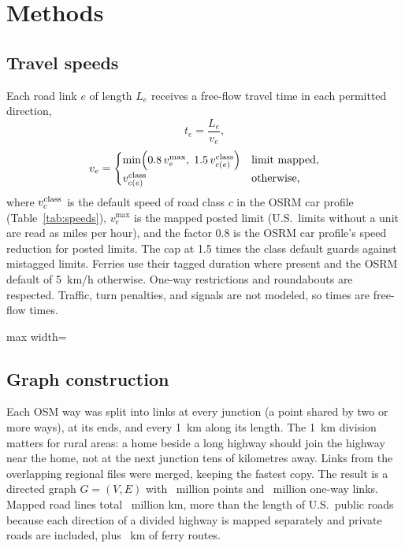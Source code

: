\documentclass[10pt,twocolumn,letterpaper]{article}
\begin{document}
\section{Methods}\label{sec:methods}

\subsection{Travel speeds}
Each road link $e$ of length $L_e$ receives a free-flow travel time in each permitted direction,
\begin{equation}
t_e=\frac{L_e}{v_e},\label{eq:time}
\end{equation}
\begin{equation}
v_e=\begin{cases}\min\!\left(0.8\,v^{\max}_e,\;1.5\,v^{\rm class}_{c(e)}\right) & \text{limit mapped,}\\[2pt] v^{\rm class}_{c(e)} & \text{otherwise,}\end{cases}\label{eq:speed}
\end{equation}
where $v^{\rm class}_{c}$ is the default speed of road class $c$ in the OSRM car profile~\cite{luxen2011} (Table~\ref{tab:speeds}), $v^{\max}_e$ is the mapped posted limit (U.S.\ limits without a unit are read as miles per hour), and the factor 0.8 is the OSRM car profile's speed reduction for posted limits. The cap at 1.5 times the class default guards against mistagged limits. Ferries use their tagged duration where present and the OSRM default of 5~km/h otherwise. One-way restrictions and roundabouts are respected. Traffic, turn penalties, and signals are not modeled, so times are free-flow times.

\begin{table}[tbp]
\centering\footnotesize
\caption{Default speeds by OpenStreetMap road class (OSRM car profile).}\label{tab:speeds}
\begin{adjustbox}{max width=\columnwidth}\end{adjustbox}
\end{table}

\subsection{Graph construction}
Each OSM way was split into links at every junction (a point shared by two or more ways), at its ends, and every 1~km along its length. The 1~km division matters for rural areas: a home beside a long highway should join the highway near the home, not at the next junction tens of kilometres away. Links from the overlapping regional files were merged, keeping the fastest copy. The result is a directed graph $G=(V,E)$ with \Vertices\ million points and \Arcs\ million one-way links. Mapped road lines total \KmRoad\ million km, more than the length of U.S.\ public roads because each direction of a divided highway is mapped separately and private roads are included, plus \KmFerry\ km of ferry routes.
\end{document}
